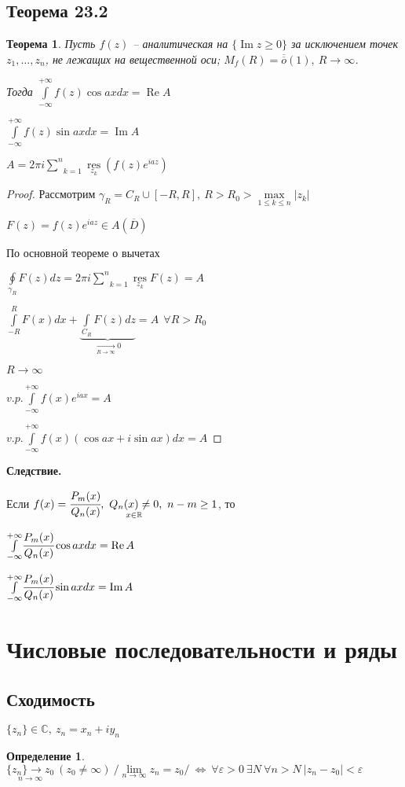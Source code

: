 \documentclass[final]{report}
\newcommand{\res}{\mathop{\mathrm{res}}\nolimits}
\renewcommand{\bf}{\bfseries}
\newcommand{\R}{\mathbb{R}}
\renewcommand{\C}{\mathbb{C}}
\newcommand{\mint}[2]{\underset{#1}{\overset{#2}{\int}}}
\newcommand{\moint}[1]{\underset{#1}{\oint}}
\newcommand{\msum}[2]{\underset{#1}{\overset{#2}{\sum}}}
\newcommand{\mres}[1]{\underset{#1}{\res}}
\newcommand{\mmax}[1]{\underset{#1}{\max}}
\newcommand{\LRA}{\Leftrightarrow}
\renewcommand{\bar}{\overline}
\renewcommand{\Im}{\mathop{\mathrm{Im}}\nolimits}
\renewcommand{\Re}{\mathop{\mathrm{Re}}\nolimits}
\newcommand{\ninf}[1]{\underset{n\to\infty}{#1}}
\newcommand{\g}{\gamma}
\newcommand{\e}{\varepsilon}
\newcommand{\F}{\ \forall}
\newcommand{\opr}[1]{\begin{opred}#1\end{opred}}
\newcommand{\lra}[1]{\underset{#1}{\longrightarrow}}
\newtheorem*{theor}{Теорема}
\newtheorem*{opred}{Определение}
\theoremstyle{remark}
\begin{document}
\subsection{Теорема 23.2}

\begin{theor}
Пусть $f(z)$ -- аналитическая на $\{\Im z\geq0\}$ за исключением точек $z_1,\ldots,z_n$, не лежащих на вещественной оси; $M_f(R)=\bar{\bar{o}}(1),\ R\to\infty$.

Тогда $\mint{-\infty}{+\infty}f(z)\cos axdx=\Re A$

$\mint{-\infty}{+\infty}f(z)\sin axdx=\Im A$

$A=2\pi i\msum{k=1}{n}\mres{z_k}\left(f(z)e^{iaz}\right)$
\end{theor}
\begin{proof}
Рассмотрим $\g_R=C_R\cup[-R,R],\ R>R_0>\mmax{1\leq k\leq n}|z_k|$

$F(z)=f(z)e^{iaz}\in A(\bar{D})$

По основной теореме о вычетах

$\moint{\g_R}F(z)dz=2\pi i\msum{k=1}{n}\mres{z_k}F(z)=A$

$\mint{-R}{R}F(x)dx+\underset{\lra{R\to\infty}0}{\underbrace{\mint{C_R}{}F(z)dz}}=A\ \F R>R_0$

$R\to\infty$

$v.p.\mint{-\infty}{+\infty}f(x)e^{iax}=A$

$v.p.\mint{-\infty}{+\infty}f(x)(\cos ax+i\sin ax)dx=A$
\end{proof}
{\bf Следствие.}

Если $f(x)=\cfrac{P_m(x)}{Q_n(x)},\ \underset{x\in\R}{Q_n(x)\neq0},\ n-m\geq1$, то

$\mint{-\infty}{+\infty}\cfrac{P_m(x)}{Q_n(x)}\cos axdx=\Re A$

$\mint{-\infty}{+\infty}\cfrac{P_m(x)}{Q_n(x)}\sin axdx=\Im A$

\newpage

\section*{Числовые последовательности и ряды}

\subsection{Сходимость}

$\{z_n\}\in\C,\ z_n=x_n+iy_n$

\opr{$\ninf{\{z_n\}\to z_0}\ (z_0\neq\infty)\ /\ninf{\lim}z_n=z_0/\ \LRA\ \forall \e>0\ \exists N\ \forall n>N\ |z_n-z_0|<\e$
}
\end{document}

